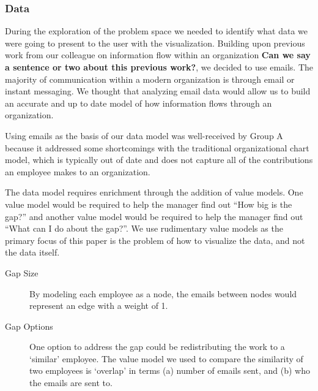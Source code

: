 \documentclass[journal]{vgtc}                %
\begin{document}
\subsubsection{Data}
During the exploration of the problem space we needed to identify what data we were going to present to the user with the visualization.  Building upon previous work from our colleague on information flow within an organization \textbf{{\color{Plum}Can we say a sentence or two about this previous work?}}, we decided to use emails.  The majority of communication within a modern organization is through email or instant messaging.  We thought that analyzing email data would allow us to build an accurate and up to date model of how information flows through an organization.  

Using emails as the basis of our data model was well-received by Group A because it addressed some shortcomings with the traditional organizational chart model, which is typically out of date and does not capture all of the contributions an employee makes to an organization.

The data model requires enrichment through the addition of value models.  One value model would be required to help the manager find out ``How big is the gap?'' and another value model would be required to help the manager find out ``What can I do about the gap?''.  We use rudimentary value models as the primary focus of this paper is the problem of how to visualize the data, and not the data itself.

\begin{description}
\item [Gap Size] By modeling each employee as a node, the emails between nodes would represent an edge with a weight of 1.
\item [Gap Options] One option to address the gap could be redistributing the work to a \lq similar\rq{} employee. The value model we used to compare the similarity of two employees is \lq overlap\rq{} in terms (a) number of emails sent, and (b) who the emails are sent to.
\end{description}
\end{document}
